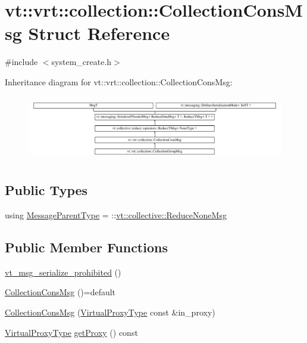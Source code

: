 \hypertarget{structvt_1_1vrt_1_1collection_1_1_collection_cons_msg}{}\section{vt\+:\+:vrt\+:\+:collection\+:\+:Collection\+Cons\+Msg Struct Reference}
\label{structvt_1_1vrt_1_1collection_1_1_collection_cons_msg}


{\ttfamily \#include $<$system\+\_\+create.\+h$>$}

Inheritance diagram for vt\+:\+:vrt\+:\+:collection\+:\+:Collection\+Cons\+Msg\+:\begin{figure}[H]
\begin{center}
\leavevmode
\includegraphics[height=2.874743cm]{structvt_1_1vrt_1_1collection_1_1_collection_cons_msg}
\end{center}
\end{figure}
\subsection*{Public Types}
\begin{DoxyCompactItemize}
\item 
using \hyperlink{structvt_1_1vrt_1_1collection_1_1_collection_cons_msg_a59f6b635772168f6a9770648f67c3c10}{Message\+Parent\+Type} = \+::\hyperlink{namespacevt_1_1collective_aa439a90f05078f2bcf918641c951946f}{vt\+::collective\+::\+Reduce\+None\+Msg}
\end{DoxyCompactItemize}
\subsection*{Public Member Functions}
\begin{DoxyCompactItemize}
\item 
\hyperlink{structvt_1_1vrt_1_1collection_1_1_collection_cons_msg_a03c2ecf64adf5d122d672aad462568e8}{vt\+\_\+msg\+\_\+serialize\+\_\+prohibited} ()
\item 
\hyperlink{structvt_1_1vrt_1_1collection_1_1_collection_cons_msg_af0c627a9c74cb19c0aa142fa650ed4eb}{Collection\+Cons\+Msg} ()=default
\item 
\hyperlink{structvt_1_1vrt_1_1collection_1_1_collection_cons_msg_a86c701bab38600f7624466909a37925e}{Collection\+Cons\+Msg} (\hyperlink{namespacevt_a1b417dd5d684f045bb58a0ede70045ac}{Virtual\+Proxy\+Type} const \&in\+\_\+proxy)
\item 
\hyperlink{namespacevt_a1b417dd5d684f045bb58a0ede70045ac}{Virtual\+Proxy\+Type} \hyperlink{structvt_1_1vrt_1_1collection_1_1_collection_cons_msg_a53a70b2333e8bd56e4a8c72c76b35283}{get\+Proxy} () const
\end{DoxyCompactItemize}
